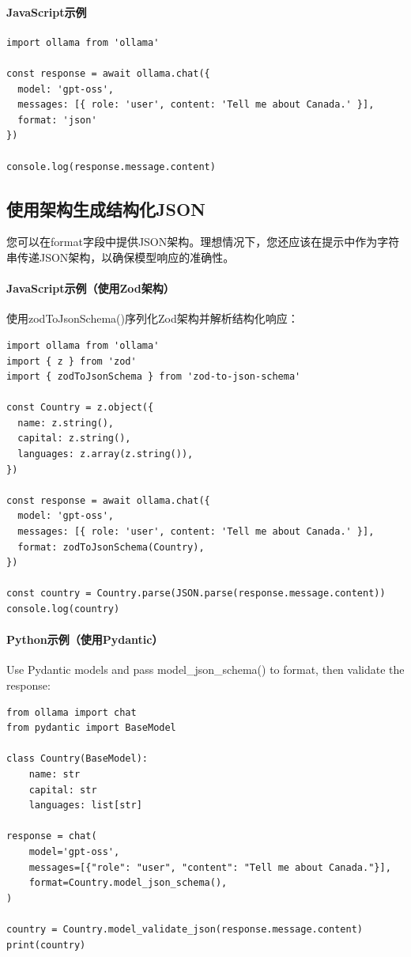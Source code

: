 \documentclass[12pt,UTF8]{ctexbook}
\begin{document}
\paragraph{JavaScript示例}
\begin{verbatim}
import ollama from 'ollama'

const response = await ollama.chat({
  model: 'gpt-oss',
  messages: [{ role: 'user', content: 'Tell me about Canada.' }],
  format: 'json'
})

console.log(response.message.content)
\end{verbatim}

\subsection{使用架构生成结构化JSON}
您可以在format字段中提供JSON架构。理想情况下，您还应该在提示中作为字符串传递JSON架构，以确保模型响应的准确性。

\paragraph{JavaScript示例（使用Zod架构）}
使用zodToJsonSchema()序列化Zod架构并解析结构化响应：
\begin{verbatim}
import ollama from 'ollama'
import { z } from 'zod'
import { zodToJsonSchema } from 'zod-to-json-schema'

const Country = z.object({
  name: z.string(),
  capital: z.string(),
  languages: z.array(z.string()),
})

const response = await ollama.chat({
  model: 'gpt-oss',
  messages: [{ role: 'user', content: 'Tell me about Canada.' }],
  format: zodToJsonSchema(Country),
})

const country = Country.parse(JSON.parse(response.message.content))
console.log(country)
\end{verbatim}

\paragraph{Python示例（使用Pydantic）}
Use Pydantic models and pass model_json_schema() to format, then validate the response:
\begin{verbatim}
from ollama import chat
from pydantic import BaseModel

class Country(BaseModel):
    name: str
    capital: str
    languages: list[str]

response = chat(
    model='gpt-oss',
    messages=[{"role": "user", "content": "Tell me about Canada."}],
    format=Country.model_json_schema(),
)

country = Country.model_validate_json(response.message.content)
print(country)
\end{verbatim}
\end{document}
